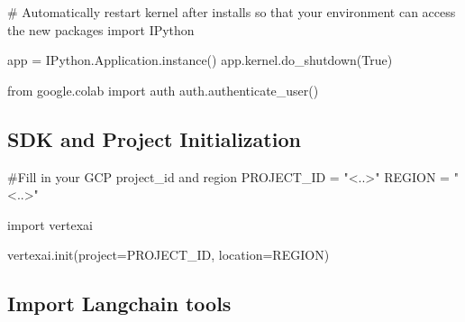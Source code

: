 \documentclass[
  letterpaper,
  DIV=11,
  numbers=noendperiod]{scrreprt}
\newenvironment{Shaded}{\begin{snugshade}}{\end{snugshade}}
\newcommand{\CommentTok}[1]{\textcolor[rgb]{0.37,0.37,0.37}{#1}}
\newcommand{\ImportTok}[1]{\textcolor[rgb]{0.00,0.46,0.62}{#1}}
\newcommand{\NormalTok}[1]{\textcolor[rgb]{0.00,0.23,0.31}{#1}}
\newcommand{\OperatorTok}[1]{\textcolor[rgb]{0.37,0.37,0.37}{#1}}
\newcommand{\StringTok}[1]{\textcolor[rgb]{0.13,0.47,0.30}{#1}}
\newcommand{\VariableTok}[1]{\textcolor[rgb]{0.07,0.07,0.07}{#1}}
\begin{document}
\begin{Shaded}
\begin{Highlighting}[]
\CommentTok{\# Automatically restart kernel after installs so that your environment can access the new packages}
\ImportTok{import}\NormalTok{ IPython}

\NormalTok{app }\OperatorTok{=}\NormalTok{ IPython.Application.instance()}
\NormalTok{app.kernel.do\_shutdown(}\VariableTok{True}\NormalTok{)}
\end{Highlighting}
\end{Shaded}

\begin{Shaded}
\begin{Highlighting}[]
\ImportTok{from}\NormalTok{ google.colab }\ImportTok{import}\NormalTok{ auth}
\NormalTok{auth.authenticate\_user()}
\end{Highlighting}
\end{Shaded}

\hypertarget{sdk-and-project-initialization-1}{%
\subsection{SDK and Project
Initialization}\label{sdk-and-project-initialization-1}}

\begin{Shaded}
\begin{Highlighting}[]
\CommentTok{\#Fill in your GCP project\_id and region}
\NormalTok{PROJECT\_ID }\OperatorTok{=} \StringTok{"\textless{}..\textgreater{}"}
\NormalTok{REGION }\OperatorTok{=} \StringTok{"\textless{}..\textgreater{}"}

\ImportTok{import}\NormalTok{ vertexai}

\NormalTok{vertexai.init(project}\OperatorTok{=}\NormalTok{PROJECT\_ID, location}\OperatorTok{=}\NormalTok{REGION)}
\end{Highlighting}
\end{Shaded}

\hypertarget{import-langchain-tools-1}{%
\subsection{Import Langchain tools}\label{import-langchain-tools-1}}
\end{document}
